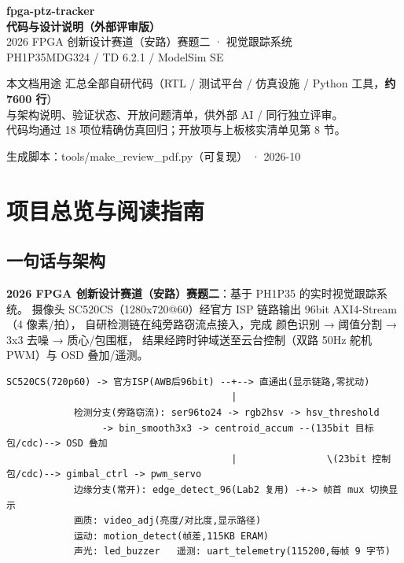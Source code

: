 \documentclass[10pt]{ctexart}
\begin{document}
\begin{titlepage}
\centering
\vspace*{2.4cm}
{\color{deep}\Huge\bfseries fpga-ptz-tracker}\\[8pt]
{\color{deep}\Large\bfseries 代码与设计说明（外部评审版）}\\[14pt]
{\large 2026 FPGA 创新设计赛道（安路）赛题二 · 视觉跟踪系统}\\[6pt]
{\large PH1P35MDG324 / TD 6.2.1 / ModelSim SE}\\[20pt]
\begin{notebox}{本文档用途}
\centering
{\small 汇总全部自研代码（RTL / 测试平台 / 仿真设施 / Python 工具，\textbf{约 7600 行}）\\
与架构说明、验证状态、开放问题清单，供外部 AI / 同行独立评审。\\
代码均通过 18 项位精确仿真回归；开放项与上板核实清单见第 8 节。}
\end{notebox}
\vfill
{\small\color{black!55} 生成脚本：tools/make\_review\_pdf.py（可复现） · 2026-10}
\end{titlepage}
\tableofcontents
\newpage


\section{项目总览与阅读指南}

\subsection{一句话与架构}

\textbf{2026 FPGA 创新设计赛道（安路）赛题二}：基于 PH1P35 的实时视觉跟踪系统。
摄像头 SC520CS（1280x720@60）经官方 ISP 链路输出 96bit AXI4-Stream（4 像素/拍），
自研检测链在纯旁路窃流点接入，完成 颜色识别 → 阈值分割 → 3x3 去噪 → 质心/包围框，
结果经跨时钟域送至云台控制（双路 50Hz 舵机 PWM）与 OSD 叠加/遥测。

\begin{Verbatim}[frame=single,fontsize=\small,breaklines=true,breakanywhere=true]
SC520CS(720p60) -> 官方ISP(AWB后96bit) --+--> 直通出(显示链路,零扰动)
                                        |
            检测分支(旁路窃流): ser96to24 -> rgb2hsv -> hsv_threshold
                 -> bin_smooth3x3 -> centroid_accum --(135bit 目标包/cdc)--> OSD 叠加
                                        |                \(23bit 控制包/cdc)--> gimbal_ctrl -> pwm_servo
            边缘分支(常开): edge_detect_96(Lab2 复用) -+-> 帧首 mux 切换显示
            画质: video_adj(亮度/对比度,显示路径)
            运动: motion_detect(帧差,115KB ERAM)
            声光: led_buzzer   遥测: uart_telemetry(115200,每帧 9 字节)
\end{Verbatim}
\end{document}
